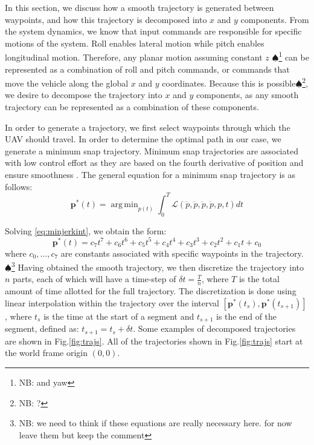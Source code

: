 \documentclass[letterpaper, 10 pt, conference]{ieeeconf}  %
\newcommand\NB[1]{$\spadesuit$\footnote{NB: #1}}
\DeclareMathOperator*{\argmin}{arg\,min}
\begin{document}
In this section, we discuss how a smooth trajectory is generated between waypoints, and how this trajectory is decomposed into $x$ and $y$ components. From the system dynamics, we know that input commands are responsible for specific motions of the system. Roll enables lateral motion while pitch enables longitudinal motion. Therefore, any planar motion assuming constant $z$ \NB{and yaw} can be represented as a combination of roll and pitch commands, or commands that move the vehicle along the global $x$ and $y$ coordinates. Because this is possible\NB{?}, we desire to decompose the trajectory into $x$ and $y$ components, as any smooth trajectory can be represented as a combination of these components.


In order to generate a trajectory, we first select waypoints through which the UAV should travel. In order to determine the optimal path in our case, we generate a minimum snap trajectory. Minimum snap trajectories are associated with low control effort as they are based on the fourth derivative of position and ensure smoothness \cite{minsnap}. The general equation for a minimum snap trajectory is as follows:
\begin{equation} \label{eq:minjerkint}
    \mathbf{p}^*(t) = \argmin_{p(t)}\int_0^T\mathcal{L}(\ddddot{p},\dddot{p},\ddot{p},\dot{p},p,t)dt
\end{equation}

Solving \eqref{eq:minjerkint}, we obtain the form:
\begin{equation}
    \mathbf{p}^*(t) = c_7t^7 + c_6t^6 + c_5t^5 + c_4t^4 + c_3t^3 + c_2t^2 + c_1t + c_0 
\end{equation}
where $c_0,\ldots,c_7$ are constants associated with specific waypoints in the trajectory.
\NB{we need to think if these equations are really necessary here. for now leave them but keep the comment}
Having obtained the smooth trajectory, we then discretize the trajectory into $n$ parts, each of which will have a time-step of $\delta t = \frac{T}{n}$, where $T$ is the total amount of time allotted for the full trajectory. The discretization is done using linear interpolation within the trajectory over the interval $[\mathbf{p}^*(t_s), \mathbf{p}^*(t_{s+1})]$, where $t_s$ is the time at the start of a segment and $t_{s+1}$ is the end of the segment, defined as: $t_{s+1} = t_s + \delta t$. 
Some examples of decomposed trajectories are shown in Fig.\ref{fig:trajs}. All of the trajectories shown in Fig.\ref{fig:trajs} start at the world frame origin $(0,0)$.
\end{document}
